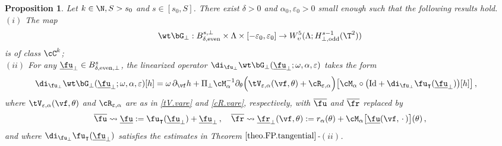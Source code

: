 \documentclass[a4paper,reqno,10pt]{article}
\newtheorem{pro}{Proposition}[section]
\newcommand{\pa}{\partial}
\begin{document}
\begin{pro}\label{lemma.map.bG.solo}
	Let $k\in\N, S>s_0$ and $s\in[s_0,S]$. There exist $\delta>0$ and  $\alpha_{0},\varepsilon_{0}>0$ small enough  such that the following results  hold.
	\\[1mm]
	\noindent $(i)$ The map
	\begin{equation}
		\wt\bG_{\perp}: B_{\delta,{\rm even}}^{s,\perp} \times \Lambda\times [-\varepsilon_{0},\varepsilon_{0}] \to W_\upsilon^5(\Lambda;H^{s-1}_{\perp,{\rm odd}}(\T^2))
	\end{equation}
	is  of class $\cC^k$;
	\\[1mm]
	\noindent $(ii)$  For any $\underline{\fu}_{\perp} \in B_{\delta,{\rm even},\perp}^{s}$,  the linearized operator $\di_{\fu_{\perp}}\wt\bG_{\perp}(\underline{\fu}_{\perp};\omega,\alpha,\varepsilon)$ takes the form 
	\begin{align}
		\di_{\fu_{\perp}}\wt\bG_{\perp}(\underline{\fu}_{\perp};\omega,\alpha,\varepsilon)
		[h] 
		&=\omega\,\pa_{\vf} h + \Pi_{\perp}\cM_{\alpha}^{-1}\pa_{\theta} \Big( \tV_{\varepsilon,\alpha}(\vf,\theta)   + \cR_{\varepsilon,\alpha}\Big)\big[ \cM_{\alpha}\circ \big( {\rm Id} + \di_{\fu_{\perp}} \fu_{\intercal}(\underline{\fu}_{\perp}) \big)[h] \big]  \,,
	\end{align}
	where $\tV_{\varepsilon,\alpha}(\vf,\theta)$ and $\cR_{\varepsilon,\alpha}$ are as in \eqref{tV.vare} and  \eqref{cR.vare}, respectively, with $\overline{\fu}$ and $\overline{\fr}$ replaced by
	\begin{equation}
		\overline{\fu} \rightsquigarrow   \underline{\fu}:= \fu_{\intercal}(\underline{\fu}_\perp) + \underline{\fu}_\perp \,, \quad \overline{\fr} \rightsquigarrow \underline{\fr}_\perp(\vf,\theta) := r_\alpha(\theta) + \cM_{\alpha}\big[ \underline{\fu}(\vf,\,\cdot\,) \big](\theta) \,,
	\end{equation}
	and where $\di_{\fu_{\perp}} \fu_{\intercal}(\underline{\fu}_{\perp})$ satisfies the estimates in Theorem $\ref{theo.FP.tangential}$-$(ii)$.
\end{pro}
\end{document}
